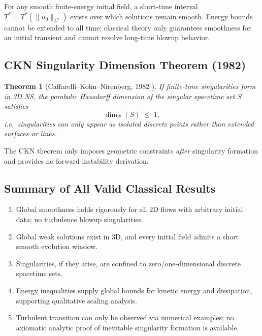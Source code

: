 \documentclass[11pt,a4paper]{article}
\newtheorem{theorem}{Theorem}
\theoremstyle{remark}
\begin{document}
For any smooth finite-energy initial field, a short-time interval $T^{*}=T^{*}(\|u_{0}\|_{L^{2}})$ exists over which solutions remain smooth. Energy bounds cannot be extended to all time; classical theory only guarantees smoothness for an initial transient and cannot resolve long-time blowup behavior.

\subsection{CKN Singularity Dimension Theorem (1982)}\label{sec:ckn}

\begin{theorem}[Caffarelli--Kohn--Nirenberg, 1982 {\citep{CKN1982}}]\label{thm:ckn}
If finite-time singularities form in 3D NS, the parabolic Hausdorff dimension of the singular spacetime set $S$ satisfies
\begin{equation}\label{eq:ckn}
\dim_{\mathcal{P}}(S) \;\le\; 1,
\end{equation}
i.e.\ singularities can only appear as isolated discrete points rather than extended surfaces or lines.
\end{theorem}

The CKN theorem only imposes geometric constraints \emph{after} singularity formation and provides no forward instability derivation.

\subsection{Summary of All Valid Classical Results}\label{sec:classical-summary}

\begin{enumerate}
    \item Global smoothness holds rigorously for all 2D flows with arbitrary initial data; no turbulence blowup singularities.
    \item Global weak solutions exist in 3D, and every initial field admits a short smooth evolution window.
    \item Singularities, if they arise, are confined to zero/one-dimensional discrete spacetime sets.
    \item Energy inequalities supply global bounds for kinetic energy and dissipation, supporting qualitative scaling analysis.
    \item Turbulent transition can only be observed via numerical examples; no axiomatic analytic proof of inevitable singularity formation is available.
\end{enumerate}
\end{document}
